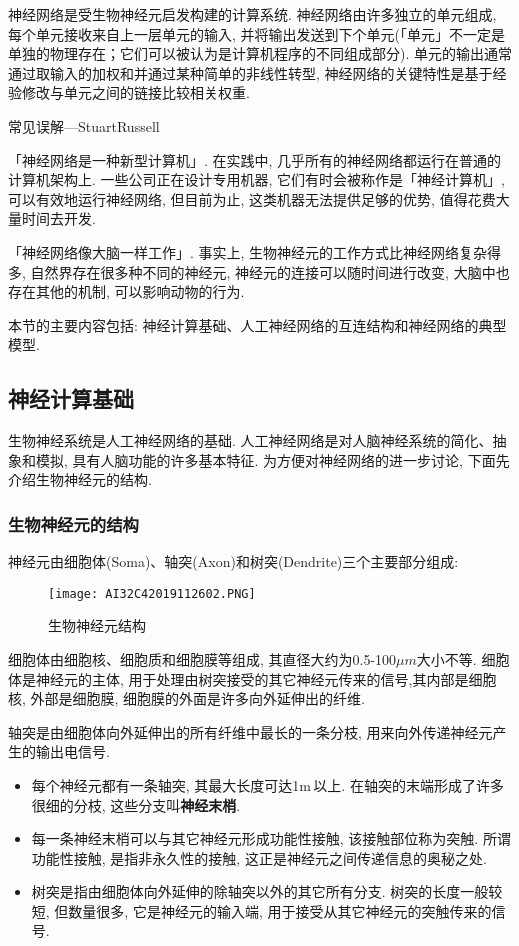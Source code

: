 神经网络是受生物神经元启发构建的计算系统. 神经网络由许多独立的单元组成, 每个单元接收来自上一层单元的输入, 并将输出发送到下个单元(「单元」不一定是单独的物理存在；它们可以被认为是计算机程序的不同组成部分). 单元的输出通常通过取输入的加权和并通过某种简单的非线性转型, 神经网络的关键特性是基于经验修改与单元之间的链接比较相关权重.

\textcolor[rgb]{0,0,1}{常见误解---StuartRussell}

「神经网络是一种新型计算机」. 在实践中, 几乎所有的神经网络都运行在普通的计算机架构上. 一些公司正在设计专用机器, 它们有时会被称作是「神经计算机」, 可以有效地运行神经网络, 但目前为止, 这类机器无法提供足够的优势, 值得花费大量时间去开发.

「神经网络像大脑一样工作」. 事实上, 生物神经元的工作方式比神经网络复杂得多, 自然界存在很多种不同的神经元, 神经元的连接可以随时间进行改变, 大脑中也存在其他的机制, 可以影响动物的行为.

本节的主要内容包括: 神经计算基础、人工神经网络的互连结构和神经网络的典型模型.
\subsection{神经计算基础}
生物神经系统是人工神经网络的基础. 人工神经网络是对人脑神经系统的简化、抽象和模拟, 具有人脑功能的许多基本特征.
为方便对神经网络的进一步讨论, 下面先介绍生物神经元的结构.
\subsubsection{生物神经元的结构}
神经元由细胞体(Soma)、轴突(Axon)和树突(Dendrite)三个主要部分组成:
\begin{figure}[H]
\centering
\texttt{[image: AI32C42019112602.PNG]}
\caption{生物神经元结构}
\label{AI32fig2602}
\end{figure}
细胞体由细胞核、细胞质和细胞膜等组成, 其直径大约为0.5-100$\si{\mu m}$大小不等. 细胞体是神经元的主体, 用于处理由树突接受的其它神经元传来的信号,其内部是细胞核, 外部是细胞膜, 细胞膜的外面是许多向外延伸出的纤维.

轴突是由细胞体向外延伸出的所有纤维中最长的一条分枝, 用来向外传递神经元产生的输出电信号.
\begin{itemize}
\item 每个神经元都有一条轴突, 其最大长度可达1\si{m}\,以上. 在轴突的末端形成了许多很细的分枝, 这些分支叫\textbf{神经末梢}.
\item 每一条神经末梢可以与其它神经元形成功能性接触, 该接触部位称为突触. 所谓功能性接触, 是指非永久性的接触, 这正是神经元之间传递信息的奥秘之处.
\item 树突是指由细胞体向外延伸的除轴突以外的其它所有分支. 树突的长度一般较短, 但数量很多, 它是神经元的输入端, 用于接受从其它神经元的突触传来的信号.
\end{itemize}
